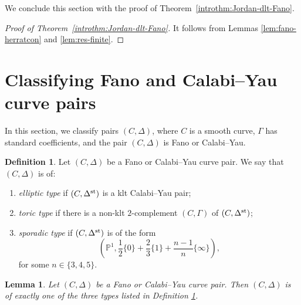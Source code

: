 \documentclass{amsart}
\newcommand{\pp}{\mathbb{P}}
\newtheorem{lemma}[theorem]{Lemma}
\theoremstyle{definition}
\newtheorem{definition}[theorem]{Definition}
\theoremstyle{remark}
\numberwithin{equation}{section}
\begin{document}
We conclude this section with the proof of Theorem~\ref{introthm:Jordan-dlt-Fano}.

\begin{proof}[Proof of Theorem~\ref{introthm:Jordan-dlt-Fano}]
It follows from Lemmas \ref{lem:fano-herratcon} and \ref{lem:res-finite}.
\end{proof}


\section{Classifying Fano and Calabi--Yau curve pairs}\label{section:trichotomy}

In this section, we classify pairs $(C,\Delta)$, where $C$ is a smooth curve, $\Gamma$ has standard coefficients, and the pair $(C,\Delta)$ is Fano or Calabi--Yau.

\begin{definition}\label{def:trichotomy}
    Let $(C,\Delta)$ be a Fano or Calabi--Yau curve pair. We say that $(C,\Delta)$ is of:
    \begin{enumerate}
    \item {\it elliptic type} if $(C,\Delta^{\rm st})$ is a klt Calabi--Yau pair;
    \item {\it toric type} if there is a non-klt $2$-complement $(C,\Gamma)$ of $(C,\Delta^{\rm st})$;
    \item {\it sporadic type} if $(C,\Delta^{\rm st})$ is of the form $$\left(\pp^1,\frac{1}{2}\{0\}+\frac{2}{3}\{1\}+\frac{n-1}{n}\{\infty\}\right),$$
    for some $n\in\{3,4,5\}$.
    \end{enumerate}
\end{definition}

\begin{lemma}
    Let $(C,\Delta)$ be a Fano or Calabi--Yau curve pair. Then $(C,\Delta)$ is of exactly one of the three types listed in Definition \ref{def:trichotomy}.
\end{lemma}
\end{document}
